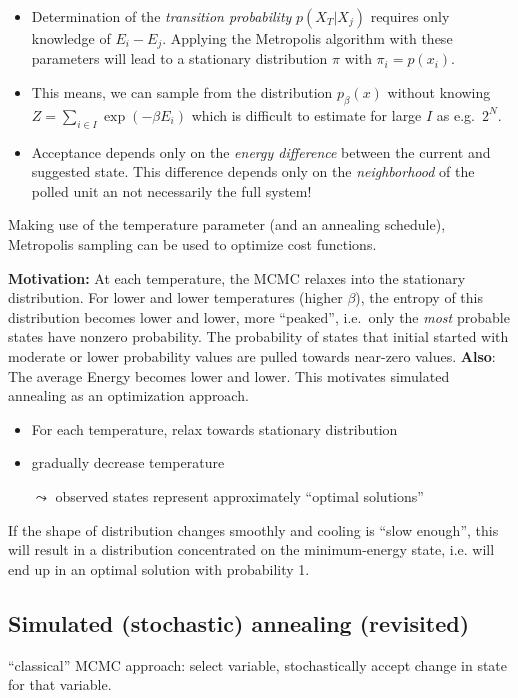 \begin{itemize}
\item Determination of the \emph{transition probability} $p(X_T|X_{j})$
  requires only knowledge of $E_i - E_j$. Applying the Metropolis
  algorithm with these parameters will lead to a stationary
  distribution $\pi$ with $\pi_i= p(x_i)$.
\item This means, we can sample from the distribution $p_\beta(x)$
  without knowing $Z=\sum_{i \in I} \exp(-\beta E_i)$ which is
  difficult to estimate for large $I$ as e.g.\ $2^N$.
\item Acceptance depends only on the \emph{energy difference} between
  the current and suggested state. This difference depends only on the
  \emph{neighborhood} of the polled unit an not necessarily the full
  system!
\end{itemize}


Making use of the temperature parameter (and an annealing schedule),
Metropolis sampling can be used to optimize cost functions.

\textbf{Motivation:} At each temperature, the MCMC relaxes into the
stationary distribution. For lower and lower temperatures (higher $\beta$), the entropy
of this distribution becomes lower and lower, more ``peaked'', i.e.\
only the \emph{most} probable states have nonzero probability. 
The probability of states that initial started with moderate or lower probability values are pulled towards near-zero values. 
\textbf{Also}: The average
Energy becomes lower and lower. This motivates simulated annealing as
an optimization approach.

\begin{itemize}
\item For each temperature, relax towards stationary distribution
\item gradually decrease temperature
\item[$\leadsto$] observed states represent approximately ``optimal solutions''
\end{itemize}
If the shape of distribution changes smoothly and cooling is ``slow
enough'', this will result in a distribution concentrated on the
minimum-energy state, i.e. will end up in an optimal solution with
probability 1.

\subsection{Simulated (stochastic) annealing (revisited)} \label{sec:stochastic-annealing}
``classical'' MCMC approach: select variable, stochastically accept
change in state for that variable. 

